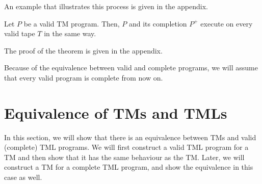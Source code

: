 An example that illustrates this process is given in the appendix.

\begin{theorem}
    Let $P$ be a valid TM program. Then, $P$ and its completion $P^+$ execute on every valid tape $T$ in the same way.
\end{theorem}
The proof of the theorem is given in the appendix.

Because of the equivalence between valid and complete programs, we will assume that every valid program is complete from now on.

\section{Equivalence of TMs and TMLs}
In this section, we will show that there is an equivalence between TMs and valid (complete) TML programs. We will first construct a valid TML program for a TM and then show that it has the same behaviour as the TM. Later, we will construct a TM for a complete TML program, and show the equivalence in this case as well.

